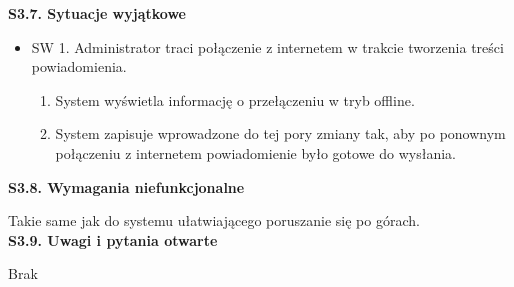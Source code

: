     \textbf{S3.7. Sytuacje wyjątkowe} \par
    \begin{itemize}
        \item []SW 1. Administrator traci połączenie z internetem w trakcie tworzenia treści powiadomienia.
        \begin{enumerate}
            \item System wyświetla informację o przełączeniu w tryb offline.
            \item System zapisuje wprowadzone do tej pory zmiany tak, aby po ponownym połączeniu z internetem powiadomienie było gotowe do wysłania.
        \end{enumerate}
    \end{itemize}
    \textbf{S3.8. Wymagania niefunkcjonalne} \par
    Takie same jak do systemu ułatwiającego poruszanie się po górach. \\
    \textbf{S3.9. Uwagi i pytania otwarte} \par
    Brak

